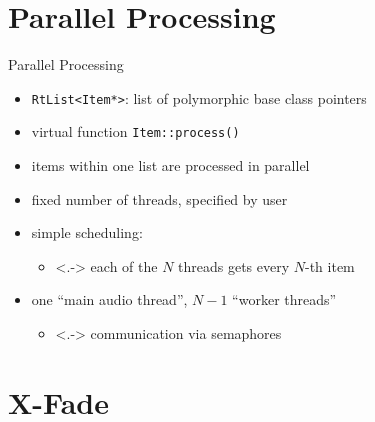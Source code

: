 \documentclass{beamer}
\newcommand{\code}{\texttt}
\begin{document}
\begin{frame}[fragile=singleslide,t]

\end{frame}

\section{Parallel Processing}

\begin{frame}{Parallel Processing}
\begin{itemize}[<+->]
\item \code{RtList<Item*>}: list of polymorphic base class pointers
\item virtual function \code{Item::process()}
\item items within one list are processed in parallel
\item fixed number of threads, specified by user
\item simple scheduling:
\begin{itemize}
\item<.-> each of the $N$ threads gets every $N$-th item
\end{itemize}
\item one ``main audio thread'', $N-1$ ``worker threads''
\begin{itemize}
\item<.-> communication via semaphores
\end{itemize}
\end{itemize}
\end{frame}

\section{X-Fade}
\end{document}
